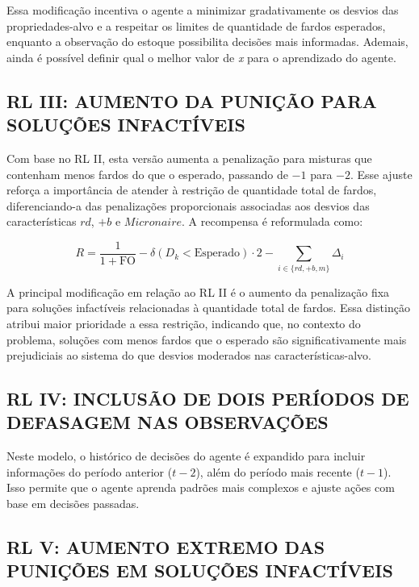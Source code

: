\documentclass[
    12pt,                %
    openright,           %
    oneside,             %
    a4paper,             %
    english,             %
    spanish,             %
    brazil               %
]{ufscar}
\begin{document}
Essa modificação incentiva o agente a minimizar gradativamente os desvios das propriedades-alvo e a respeitar os limites de quantidade de fardos esperados, enquanto a observação do estoque possibilita decisões mais informadas. Ademais, ainda é possível definir qual o melhor valor de \textit{x} para o aprendizado do agente.

\subsection{RL III: AUMENTO DA PUNIÇÃO PARA SOLUÇÕES INFACTÍVEIS}

Com base no RL II, esta versão aumenta a penalização para misturas que contenham menos fardos do que o esperado, passando de \(-1\) para \(-2\). Esse ajuste reforça a importância de atender à restrição de quantidade total de fardos, diferenciando-a das penalizações proporcionais associadas aos desvios das características \(rd\), \(+b\) e \(Micronaire\). A recompensa é reformulada como:

\begin{equation}
R = \frac{1}{1 + \text{FO}} - \delta(D_k < \text{Esperado}) \cdot 2 - \sum_{i \in \{rd, +b, m\}} \Delta_i
\end{equation}

A principal modificação em relação ao RL II é o aumento da penalização fixa para soluções infactíveis relacionadas à quantidade total de fardos. Essa distinção atribui maior prioridade a essa restrição, indicando que, no contexto do problema, soluções com menos fardos que o esperado são significativamente mais prejudiciais ao sistema do que desvios moderados nas características-alvo. 

\subsection{RL IV: INCLUSÃO DE DOIS PERÍODOS DE DEFASAGEM NAS OBSERVAÇÕES}

Neste modelo, o histórico de decisões do agente é expandido para incluir informações do período anterior (\(t-2\)), além do período mais recente (\(t-1\)). Isso permite que o agente aprenda padrões mais complexos e ajuste ações com base em decisões passadas. 

\subsection{RL V: AUMENTO EXTREMO DAS PUNIÇÕES EM SOLUÇÕES INFACTÍVEIS}
\end{document}
